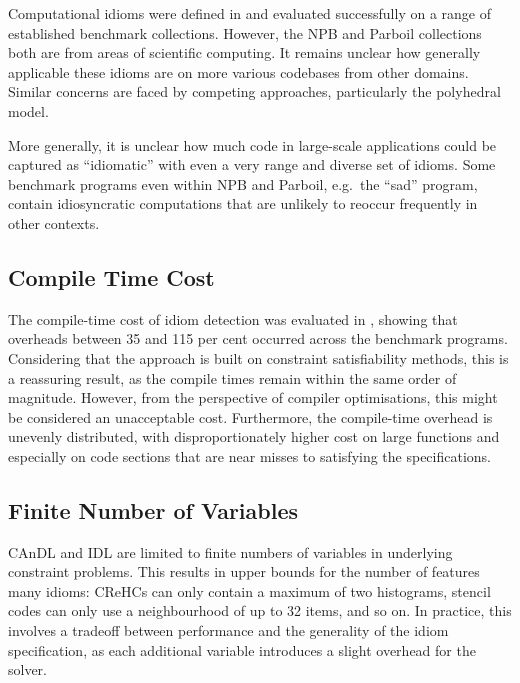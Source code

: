     Computational idioms were defined in
     and
    evaluated successfully on a range of established benchmark collections.
    However, the NPB and Parboil collections both are from areas of scientific
    computing.
    It remains unclear how generally applicable these idioms are on more
    various codebases from other domains.
    Similar concerns are faced by competing approaches, particularly the
    polyhedral model.

    More generally, it is unclear how much code in large-scale applications
    could be captured as ``idiomatic'' with even a very range and diverse set of
    idioms.
    Some benchmark programs even within NPB and Parboil, e.g.\ the ``sad''
    program, contain idiosyncratic computations that are unlikely to reoccur
    frequently in other contexts.

\subsection*{Compile Time Cost}

    The compile-time cost of idiom detection was evaluated in
    , showing that overheads between 35 and 115 per cent
    occurred across the benchmark programs.
    Considering that the approach is built on constraint satisfiability
    methods, this is a reassuring result, as the compile times remain within the
    same order of magnitude.
    However, from the perspective of compiler optimisations, this might be
    considered an unacceptable cost.
    Furthermore, the compile-time overhead is unevenly distributed, with
    disproportionately higher cost on large functions and especially on code
    sections that are near misses to satisfying the specifications.

\subsection*{Finite Number of Variables}

    CAnDL and IDL are limited to finite numbers of variables in underlying
    constraint problems.
    This results in upper bounds for the number of features many idioms:
    CReHCs can only contain a maximum of two histograms, stencil codes can only
    use a neighbourhood of up to 32 items, and so on.
    In practice, this involves a tradeoff between performance and the generality
    of the idiom specification, as each additional variable introduces a slight
    overhead for the solver.

